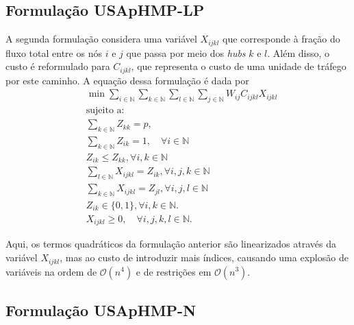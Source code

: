 \subsection{Formulação USApHMP-LP}
A segunda formulação considera uma variável $X_{ijkl}$ que corresponde à fração do fluxo total entre os nós $i$ e $j$ que passa por meio dos \textit{hubs} $k$ e $l$. Além disso, o custo é reformulado para $C_{ijkl}$, que representa o custo de uma unidade de tráfego por este caminho. A equação dessa formulação é dada por
\begin{align}
        &\min \sum_{i \in \mathbb{N}}\sum_{k \in \mathbb{N}}\sum_{l \in \mathbb{N}}\sum_{j \in \mathbb{N}}W_{ij}C_{ijkl}X_{ijkl} \\ & \text{sujeito a:} \\ & \sum_{k \in \mathbb{N}}Z_{kk}=p, \label{eq11}\\ &\sum_{k \in \mathbb{N}}Z_{ik}=1, \label{eq12}\quad \forall i \in \mathbb{N} \\ & Z_{ik} \leq Z_{kk}, \forall i,k \in \mathbb{N} \label{eq14} \\ & \sum_{l \in \mathbb{N}}X_{ijkl} = Z_{ik}, \forall i,j,k \in \mathbb{N} \\ & \sum_{k \in \mathbb{N}}X_{ijkl} = Z_{jl}, \forall i,j,l \in \mathbb{N}\\ & Z_{ik} \in \{0,1\}, \forall i,k \in \mathbb{N}. \label{eq13} \\ & X_{ijkl} \geq 0, \quad \forall i,j,k,l \in \mathbb{N}.
\end{align}

Aqui, os termos quadráticos da formulação anterior são linearizados através da variável $X_{ijkl}$, mas ao custo de introduzir mais índices, causando uma explosão de variáveis na ordem de $\mathcal{O}(n^4)$ e de restrições em $\mathcal{O}(n^3)$.

\subsection{Formulação USApHMP-N}

